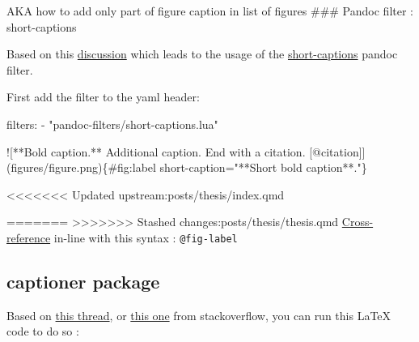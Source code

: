 \documentclass[
  letterpaper,
  DIV=11,
  numbers=noendperiod]{scrreprt}
\newenvironment{Shaded}{\begin{snugshade}}{\end{snugshade}}
\newcommand{\AttributeTok}[1]{\textcolor[rgb]{0.40,0.45,0.13}{#1}}
\newcommand{\CommentTok}[1]{\textcolor[rgb]{0.37,0.37,0.37}{#1}}
\newcommand{\FunctionTok}[1]{\textcolor[rgb]{0.28,0.35,0.67}{#1}}
\newcommand{\KeywordTok}[1]{\textcolor[rgb]{0.00,0.23,0.31}{#1}}
\newcommand{\NormalTok}[1]{\textcolor[rgb]{0.00,0.23,0.31}{#1}}
\newcommand{\OtherTok}[1]{\textcolor[rgb]{0.00,0.23,0.31}{#1}}
\newcommand{\StringTok}[1]{\textcolor[rgb]{0.13,0.47,0.30}{#1}}
\begin{document}
AKA how to add only part of figure caption in list of figures \#\#\#
Pandoc filter : short-captions

Based on this
\href{https://github.com/quarto-dev/quarto-cli/discussions/3769}{discussion}
which leads to the usage of the
\href{https://github.com/pandoc/lua-filters/tree/master/short-captions}{short-captions}
pandoc filter.

First add the filter to the yaml header:

\begin{Shaded}
\begin{Highlighting}[]
\FunctionTok{filters}\KeywordTok{:}
\AttributeTok{  }\KeywordTok{{-}}\AttributeTok{ }\StringTok{"pandoc{-}filters/short{-}captions.lua"}
\end{Highlighting}
\end{Shaded}

\begin{Shaded}
\begin{Highlighting}[]
\NormalTok{!}\CommentTok{[}\OtherTok{**Bold caption.** Additional caption. End with a citation. [@citation]}\CommentTok{](figures/figure.png)}\NormalTok{\{\#fig:label short{-}caption="**Short bold caption**."\}}
\end{Highlighting}
\end{Shaded}

\textless\textless\textless\textless\textless\textless\textless{}
Updated upstream:posts/thesis/index.qmd

=======
\textgreater\textgreater\textgreater\textgreater\textgreater\textgreater\textgreater{}
Stashed changes:posts/thesis/thesis.qmd
\href{https://quarto.org/docs/authoring/cross-references.html}{Cross-reference}
in-line with this syntax : \texttt{@fig-label}

\hypertarget{captioner-package}{%
\subsection{captioner package}\label{captioner-package}}

Based on
\href{https://stackoverflow.com/questions/69094228/give-a-single-figure-multiple-captions-in-rmarkdown-pdf-book-output}{this
thread}, or
\href{https://tex.stackexchange.com/questions/83392/change-caption-in-list-of-tables}{this
one} from stackoverflow, you can run this LaTeX code to do so :
\end{document}
